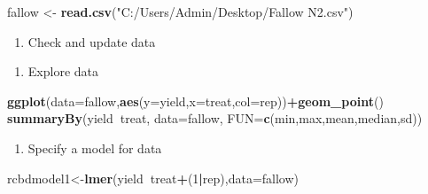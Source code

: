 \documentclass[]{book}
\newenvironment{Shaded}{\begin{snugshade}}{\end{snugshade}}
\newcommand{\KeywordTok}[1]{\textcolor[rgb]{0.13,0.29,0.53}{\textbf{#1}}}
\newcommand{\DataTypeTok}[1]{\textcolor[rgb]{0.13,0.29,0.53}{#1}}
\newcommand{\DecValTok}[1]{\textcolor[rgb]{0.00,0.00,0.81}{#1}}
\newcommand{\StringTok}[1]{\textcolor[rgb]{0.31,0.60,0.02}{#1}}
\newcommand{\OperatorTok}[1]{\textcolor[rgb]{0.81,0.36,0.00}{\textbf{#1}}}
\newcommand{\NormalTok}[1]{#1}
\providecommand{\tightlist}{%
  \setlength{\itemsep}{0pt}\setlength{\parskip}{0pt}}
\theoremstyle{definition}
\theoremstyle{definition}
\theoremstyle{definition}
\theoremstyle{remark}
\begin{document}
\begin{Shaded}
\begin{Highlighting}[]
\NormalTok{fallow <-}\StringTok{ }\KeywordTok{read.csv}\NormalTok{(}\StringTok{"C:/Users/Admin/Desktop/Fallow N2.csv"}\NormalTok{)}
\end{Highlighting}
\end{Shaded}

\begin{enumerate}
\def\labelenumi{\arabic{enumi}.}
\setcounter{enumi}{2}
\tightlist
\item
  Check and update data
\end{enumerate}

\begin{Shaded}
\end{Shaded}

\begin{enumerate}
\def\labelenumi{\arabic{enumi}.}
\setcounter{enumi}{3}
\tightlist
\item
  Explore data
\end{enumerate}

\begin{Shaded}
\begin{Highlighting}[]
\KeywordTok{ggplot}\NormalTok{(}\DataTypeTok{data=}\NormalTok{fallow,}\KeywordTok{aes}\NormalTok{(}\DataTypeTok{y=}\NormalTok{yield,}\DataTypeTok{x=}\NormalTok{treat,}\DataTypeTok{col=}\NormalTok{rep))}\OperatorTok{+}\KeywordTok{geom_point}\NormalTok{()}
\KeywordTok{summaryBy}\NormalTok{(yield}\OperatorTok{~}\NormalTok{treat, }\DataTypeTok{data=}\NormalTok{fallow, }\DataTypeTok{FUN=}\KeywordTok{c}\NormalTok{(min,max,mean,median,sd))}
\end{Highlighting}
\end{Shaded}

\begin{enumerate}
\def\labelenumi{\arabic{enumi}.}
\setcounter{enumi}{4}
\tightlist
\item
  Specify a model for data
\end{enumerate}

\begin{Shaded}
\begin{Highlighting}[]
\NormalTok{rcbdmodel1<-}\KeywordTok{lmer}\NormalTok{(yield}\OperatorTok{~}\NormalTok{treat}\OperatorTok{+}\NormalTok{(}\DecValTok{1}\OperatorTok{|}\NormalTok{rep),}\DataTypeTok{data=}\NormalTok{fallow)}
\end{Highlighting}
\end{Shaded}
\end{document}
